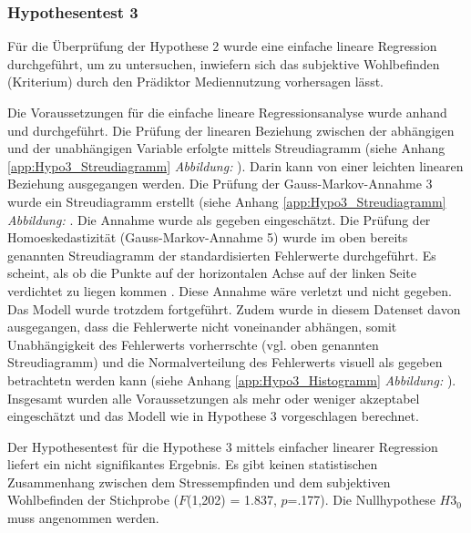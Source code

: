 \subsubsection{Hypothesentest 3}
Für die Überprüfung der Hypothese 2 wurde eine einfache lineare Regression durchgeführt, um zu untersuchen, inwiefern sich das subjektive Wohlbefinden (Kriterium) durch den Prädiktor Mediennutzung vorhersagen lässt.

Die Voraussetzungen für die einfache lineare Regressionsanalyse wurde anhand  und  durchgeführt. Die Prüfung der linearen Beziehung zwischen der abhängigen und der unabhängigen Variable erfolgte mittels Streudiagramm (siehe Anhang \ref{app:Hypo3_Streudiagramm}  \textit{Abbildung: }). Darin kann von einer leichten linearen Beziehung ausgegangen werden. Die Prüfung der Gauss-Markov-Annahme 3 \cite{UniversitatZurich2018} wurde ein Streudiagramm erstellt (siehe Anhang \ref{app:Hypo3_Streudiagramm} \textit{Abbildung: }. Die Annahme wurde als gegeben eingeschätzt. Die Prüfung der Homoeskedastizität (Gauss-Markov-Annahme 5) wurde im oben bereits genannten Streudiagramm der standardisierten Fehlerwerte durchgeführt. Es scheint, als ob die Punkte auf der horizontalen Achse auf der linken Seite verdichtet zu liegen kommen \cite{Hemmerich2018}. Diese Annahme wäre verletzt und nicht gegeben. Das Modell wurde trotzdem fortgeführt. Zudem wurde in diesem Datenset davon ausgegangen, dass die Fehlerwerte nicht voneinander abhängen, somit Unabhängigkeit des Fehlerwerts vorherrschte (vgl. oben genannten Streudiagramm) und die Normalverteilung des Fehlerwerts visuell als gegeben betrachtetn werden kann (siehe Anhang \ref{app:Hypo3_Histogramm} \textit{Abbildung: }). Insgesamt wurden alle Voraussetzungen als mehr oder weniger akzeptabel eingeschätzt und das Modell wie in Hypothese 3 vorgeschlagen berechnet.

Der Hypothesentest für die Hypothese 3 mittels einfacher linearer Regression liefert ein nicht signifikantes Ergebnis. Es gibt keinen statistischen Zusammenhang zwischen dem Stressempfinden und dem subjektiven Wohlbefinden der Stichprobe ($F$(1,202) = 1.837, $p$=.177).  Die Nullhypothese $H3_{0}$ muss angenommen werden.

